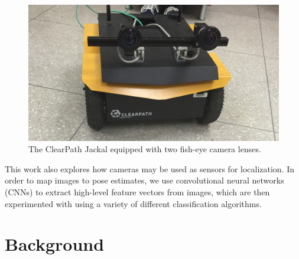 \documentclass[letterpaper, 12 pt, conference]{ieeeconf}  %
\begin{document}
\begin{figure}[h]
\centering
\includegraphics[scale=0.09]{jackal}
\caption{The ClearPath Jackal equipped with two fish-eye camera lenses.}
\end{figure}

\par 
This work also explores how cameras may be used as sensors for localization. In order to map images to pose estimates, we use convolutional neural networks (CNNs) to extract high-level feature vectors from images, which are then experimented with using a variety of different classification algorithms. 

\section{Background}
\end{document}
